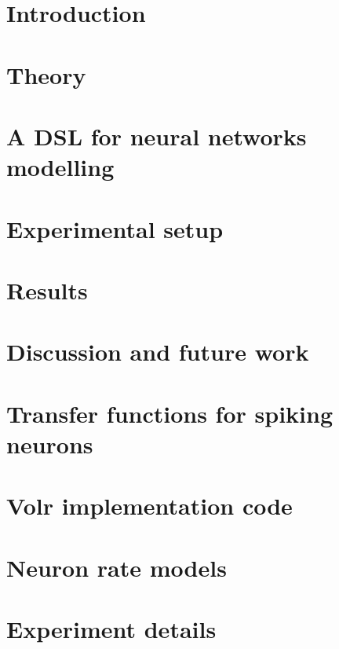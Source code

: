 \documentclass[a4paper,oneside]{memoir}
\begin{document}
\chapter{Introduction} \label{sec:intro}
  

\chapter{Theory} \label{sec:theory}
  

\chapter{A DSL for neural networks modelling} \label{sec:dsl}
  

\chapter{Experimental setup} \label{sec:experiment}
  

  \chapter{Results} \label{sec:results}
  

\chapter{Discussion and future work} \label{sec:discussion}
  

\appendix

\begingroup
\renewcommand{\cleardoublepage}{}
\renewcommand{\clearpage}{}
\chapter{Transfer functions for spiking neurons} \label{app:transfer}
  
\chapter{Volr implementation code} \label{app:implementation}
  
\chapter{Neuron rate models} \label{app:verification}
  
\chapter{Experiment details} \label{app:experiment}
  

\endgroup
\backmatter

\printglossary

\printbibliography
 
\printindex
\end{document}
